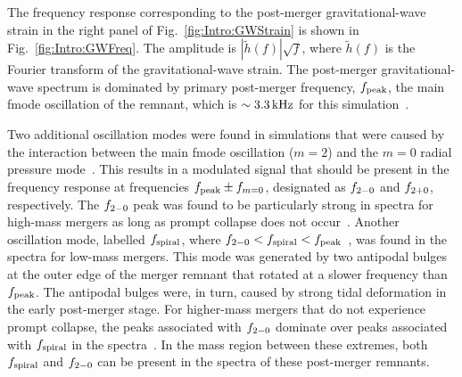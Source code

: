 \documentclass[../Thesis.tex]{subfiles}
\begin{document}
    The frequency response corresponding to the post-merger gravitational-wave strain in the right panel of Fig.~\ref{fig:Intro:GWStrain} is shown in Fig.~\ref{fig:Intro:GWFreq}.
    The amplitude is  $|\tilde{h}(f)|\sqrt{f}$, where $\tilde{h}(f)$ is the Fourier transform of the gravitational-wave strain. 
    The post-merger gravitational-wave spectrum is dominated by primary post-merger frequency, $f_{\mathrm{peak}}$, the main f\Hyphdash*mode oscillation of the remnant, which is $\sim 3.3\,\mathrm{kHz}$ for this simulation~\cite[e.g.,][]{Shibata1992, Zhuge1994,Stergioulas2011}. \par
    
    Two additional oscillation modes were found in simulations that were caused by the interaction between the main f\Hyphdash*mode oscillation ($m=2$) and the $m=0$ radial pressure mode~\cite{Stergioulas2011}.
    This results in a modulated signal that should be present in the frequency response at frequencies $f_{\mathrm{peak}} \pm f_{m=0}$, designated as $f_{2-0}$ and $f_{2+0}$, respectively.
    The $f_{2-0}$ peak was found to be particularly strong in spectra for high-mass mergers as long as prompt collapse does not occur~\cite{Bauswein2015}.
    Another oscillation mode, labelled $f_{\mathrm{spiral}}$, where $f_{2-0} < f_{\mathrm{spiral}} < f_{\mathrm{peak}}$~\cite{Bauswein2015}, was found in the spectra for low-mass mergers.
    This mode was generated by two antipodal bulges at the outer edge of the merger remnant that rotated at a slower frequency than $f_{\mathrm{peak}}$.
    The antipodal bulges were, in turn, caused by strong tidal deformation in the early post-merger stage.
    For higher-mass mergers that do not experience prompt collapse, the peaks associated with $f_{2-0}$ dominate over peaks associated with $f_{\mathrm{spiral}}$ in the spectra~\cite{Bauswein2015}.
    In the mass region between these extremes, both $f_{\mathrm{spiral}}$ and $f_{2-0}$ can be present in the spectra of these post-merger remnants. \par
    
\end{document}
